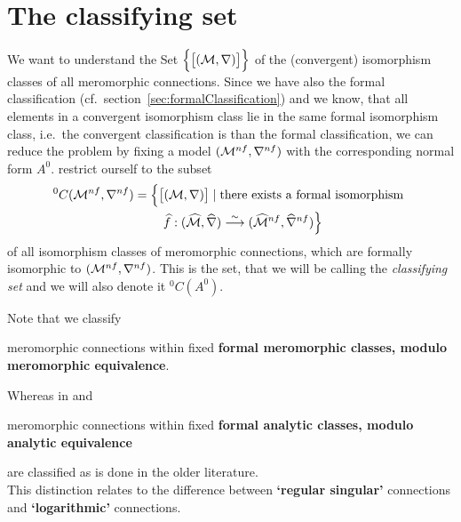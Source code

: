 \section{The classifying set}
We want to understand the Set
$\Big\{\big[(\mathcal{M},\nabla)\big]\Big\}$ of the (convergent)
isomorphism classes of all meromorphic connections. Since we have also the
formal classification (cf.\ section~\ref{sec:formalClassification}) and we
know, that all elements in a convergent isomorphism class lie in the same
formal isomorphism class, i.e.\ the convergent classification is
 than the formal classification, we can reduce the problem by
fixing a model $(\mathcal{M}^{nf},\nabla^{nf})$ with the corresponding normal form
$A^0$.
 restrict ourself to the subset
\begin{multline*}
  {}^0C(\mathcal{M}^{nf},\nabla^{nf})=\Big\{
    \big[(\mathcal{M},\nabla)\big]
    \mid \text{there exists a formal isomorphism }
  \\\qquad\widehat f:(\widehat{\mathcal{M}},\widehat\nabla)
      \overset{\sim}\longrightarrow
      (\widehat{\mathcal{M}}^{nf},\widehat\nabla^{nf})
  \Big\}
\end{multline*}
of all isomorphism classes of meromorphic connections, which are formally
isomorphic to $(\mathcal{M}^{nf},\nabla^{nf})$. This is the set, that we will be
calling the \emph{classifying set} and we will also denote it ${}^0C(A^0)$.
\begin{rem}
  Note that we classify
  \begin{einr}
    meromorphic connections within fixed \textbf{formal meromorphic classes,
    modulo meromorphic equivalence}.
  \end{einr}
  Whereas in \cite{boalch} and \cite{thboalch}
  \begin{einr}
    meromorphic connections within fixed \textbf{formal analytic classes,
    modulo analytic equivalence}
  \end{einr}
  are classified as is done in the older literature. 
  \\This distinction relates to the difference between \textbf{‘regular
  singular’} connections and \textbf{‘logarithmic’} connections.
\end{rem}
\begin{comment}
  \begin{itemize}
    \item \cite{thboalch} p.6
      \begin{itemize}
        \item \cite{boalch} p.19
      \end{itemize}
    \item \cite{Loday1994} p.852
    \item \cite{sabbah2007isomonodromic} p.111
    \item \cite{babbitt1983}
  \end{itemize}
\end{comment}

